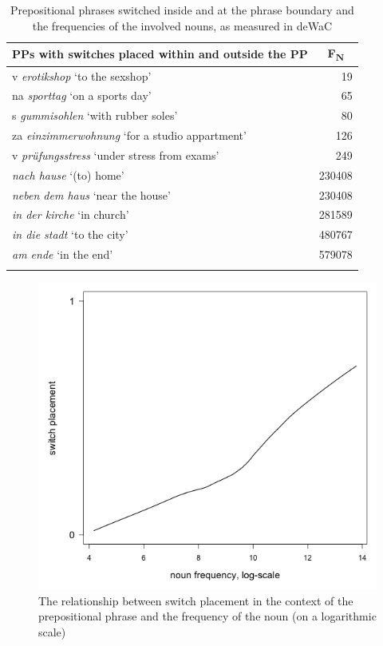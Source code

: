 \begin{table}
\begin{tabular}{lr}
		\lsptoprule
		PPs with switches placed within and outside the PP & \multicolumn{1}{c}{F\textsubscript{N}}\\\midrule
			v \textit{erotikshop} `to the sexshop' & 19\\
			na \textit{sporttag} `on a sports day' & 65\\
			s \textit{gummisohlen} `with rubber soles' & 80\\
			za \textit{einzimmerwohnung} `for a studio appartment' & 126\\
			v \textit{prüfungsstress} `under stress from exams' & 249\\
			\midrule
			\textit{nach hause} `(to) home' & 230408\\
			\textit{neben dem haus} `near the house' & 230408\\
			\textit{in der kirche} `in church' & 281589\\
			\textit{in die stadt} `to the city' & 480767\\
			\textit{am ende} `in the end' & 579078\\
		\lspbottomrule
	\end{tabular}
	\caption{Prepositional phrases switched inside and at the phrase boundary and the frequencies of the involved nouns, as measured in deWaC\label{tab:5:4}}
\end{table}

\begin{figure}
    	\includegraphics[scale=0.5]{figures/5-Figure_3.png}	
		\caption{The relationship between switch placement in the context of the prepositional phrase and the frequency of the noun (on a logarithmic scale)}
	\label{fig:5:3}
\end{figure}

